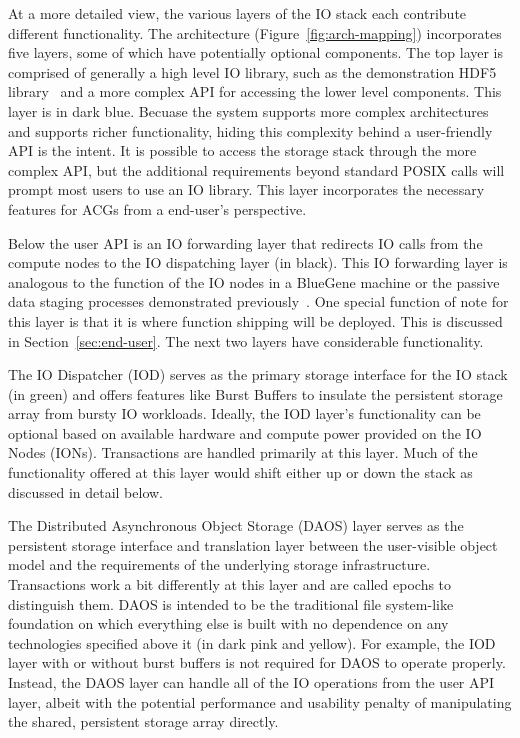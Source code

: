 \documentclass[conference]{IEEEtran} \pdfpagewidth=8.5in
\begin{document}
At a more detailed view, the various layers of the IO stack each contribute
different functionality.  The architecture (Figure~\ref{fig:arch-mapping})
incorporates five layers, some of which have potentially optional components.
The top layer is comprised of generally a high level IO library, such as the
demonstration HDF5 library~\cite{hdf5} and a more complex API for accessing the
lower level components. This layer is in dark blue. Becuase the system supports
more complex architectures and supports richer functionality, hiding this
complexity behind a user-friendly API is the intent. It is possible to 
access the storage stack through the more complex API, but the additional
requirements beyond standard POSIX calls will prompt most users to use an IO
library.  This layer incorporates the necessary features for ACGs from a
end-user's perspective.

Below the user API is an IO forwarding layer that redirects IO calls from the
compute nodes to the IO dispatching layer (in black).  This IO forwarding layer
is analogous to the function of the IO nodes in a BlueGene machine or the
passive data staging processes demonstrated
previously~\cite{nisar:2008:staging,Abbasi:2009:datatap}. One special function
of note for this layer is that it is where function shipping will be deployed.
This is discussed in Section~\ref{sec:end-user}. The next two layers have
considerable functionality.

The IO Dispatcher (IOD) serves as the primary storage interface for the IO
stack (in green) and offers features like Burst Buffers to insulate the
persistent storage array from bursty IO workloads.  Ideally, the IOD layer's
functionality can be optional based on available hardware and compute power
provided on the IO Nodes (IONs). Transactions are handled primarily at this
layer. Much of the functionality offered at this layer would shift either up or
down the stack as discussed in detail below.

The Distributed Asynchronous Object Storage (DAOS) layer serves as the
persistent storage interface and translation layer between the user-visible
object model and the requirements of the underlying storage infrastructure. 
Transactions work a bit differently at this layer and are called epochs to
distinguish them. DAOS is intended to be the traditional file system-like
foundation on which everything else is built with no dependence on any
technologies specified above it (in dark pink and yellow). For example, the IOD
layer with or without burst buffers is not required for DAOS to operate
properly.  Instead, the DAOS layer can handle all of the IO operations from the
user API layer, albeit with the potential performance and usability penalty of
manipulating the shared, persistent storage array directly.
\end{document}
